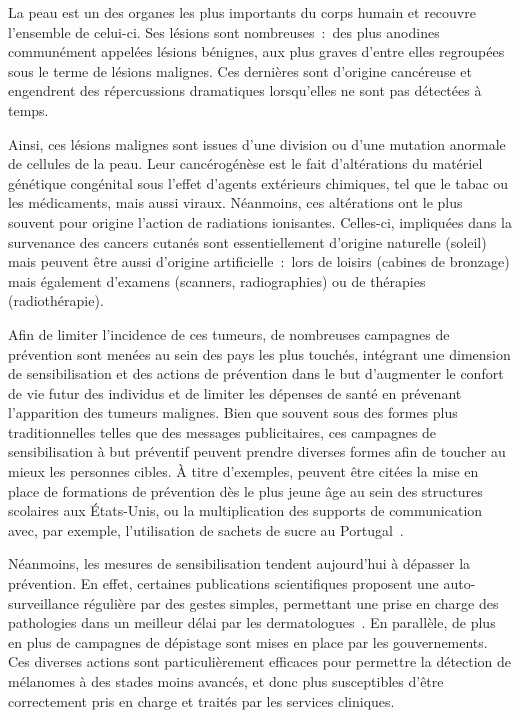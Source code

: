 \renewcommand{\thechapter}{\roman{chapter}}
\setcounter{chapter}{1}
\setcounter{figure}{0}

\label{chap:introduction}
La peau est un des organes les plus importants du corps humain et recouvre l'ensemble de celui-ci. Ses lésions sont nombreuses~:~des plus anodines communément appelées lésions bénignes, aux plus graves d'entre elles regroupées sous le terme de lésions malignes. Ces dernières sont d'origine cancéreuse et engendrent des répercussions dramatiques lorsqu'elles ne sont pas détectées à temps.\par

Ainsi, ces lésions malignes sont issues d’une division ou d’une mutation anormale de cellules de la peau. Leur cancérogénèse est le fait d'altérations du matériel génétique congénital sous l'effet d'agents extérieurs chimiques, tel que le tabac ou les médicaments, mais aussi viraux. Néanmoins, ces altérations ont le plus souvent pour origine l'action de radiations ionisantes. Celles-ci, impliquées dans la survenance des cancers cutanés sont essentiellement d'origine naturelle (soleil) mais peuvent être aussi d'origine artificielle~:~lors de loisirs (cabines de bronzage) mais également d'examens (scanners, radiographies) ou de thérapies (radiothérapie).\par

Afin de limiter l’incidence de ces tumeurs, de nombreuses campagnes de prévention sont menées au sein des pays les plus touchés, intégrant une dimension de sensibilisation et des actions de prévention dans le but d’augmenter le confort de vie futur des individus et de limiter les dépenses de santé en prévenant l'apparition des tumeurs malignes. Bien que souvent sous des formes plus traditionnelles telles que des messages publicitaires, ces campagnes de sensibilisation à but préventif peuvent prendre diverses formes afin de toucher au mieux les personnes cibles. À titre d’exemples, peuvent être citées la mise en place de formations de prévention dès le plus jeune âge au sein des structures scolaires aux États-Unis, ou la multiplication des supports de communication avec, par exemple, l’utilisation de sachets de sucre au Portugal~\cite{Guy2016,Correia2017}.\par 

Néanmoins, les mesures de sensibilisation tendent aujourd’hui à dépasser la prévention. En effet, certaines publications scientifiques proposent une auto-surveillance régulière par des gestes simples, permettant une prise en charge des pathologies dans un meilleur délai par les dermatologues~\cite{Friedman1985}. En parallèle, de plus en plus de campagnes de dépistage sont mises en place par les gouvernements. Ces diverses actions sont particulièrement efficaces pour permettre la détection de mélanomes à des stades moins avancés, et donc plus susceptibles d'être correctement pris en charge et traités par les services cliniques.\par

